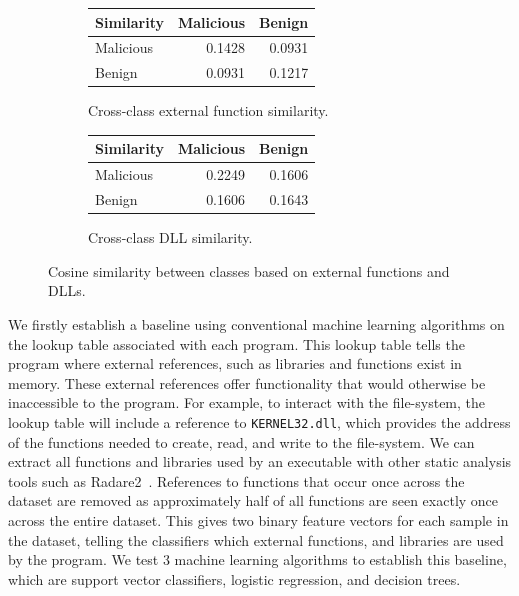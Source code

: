 \documentclass[conference,compsoc]{IEEEtran}
\begin{document}
\begin{figure}[h]
    \begin{subfigure}{0.4\textwidth}
        \centering
        \begin{tabular}{@{}l|rr@{}}
        \toprule
        \textbf{Similarity} & \multicolumn{1}{l}{Malicious} & \multicolumn{1}{l}{Benign} \\ \midrule
        Malicious           & 0.1428                        & 0.0931                     \\
        Benign              & 0.0931                        & 0.1217                     \\ \bottomrule
        \end{tabular}
        \caption{Cross-class external function similarity.}
    \end{subfigure}
    \hfill
    \begin{subfigure}{0.4\textwidth}
        \centering
        \begin{tabular}{@{}l|rr@{}}
        \toprule
        \textbf{Similarity} & \multicolumn{1}{l}{Malicious} & \multicolumn{1}{l}{Benign} \\ \midrule
        Malicious           & 0.2249                        & 0.1606                     \\
        Benign              & 0.1606                        & 0.1643                     \\ \bottomrule
        \end{tabular}
        \caption{Cross-class DLL similarity.}
    \end{subfigure}
    \caption{Cosine similarity between classes based on external functions and DLLs.}
    \label{fig:similarity}
\end{figure}

\noindent 
We firstly establish a baseline using conventional machine learning algorithms on the lookup table associated with each program. This lookup table tells the program where external references, such as libraries and functions exist in memory. These external references offer functionality that would otherwise be inaccessible to the program. For example, to interact with the file-system, the lookup table will include a reference to \texttt{KERNEL32.dll}, which provides the address of the functions needed to create, read, and write to the file-system. We can extract all functions and libraries used by an executable with other static analysis tools such as Radare2~\cite{radareorganizationRadare22025}. References to functions that occur once across the dataset are removed as approximately half of all functions are seen exactly once across the entire dataset. This gives two binary feature vectors for each sample in the dataset, telling the classifiers which external functions, and libraries are used by the program. We test 3 machine learning algorithms to establish this baseline, which are support vector classifiers, logistic regression, and decision trees. 
\end{document}
